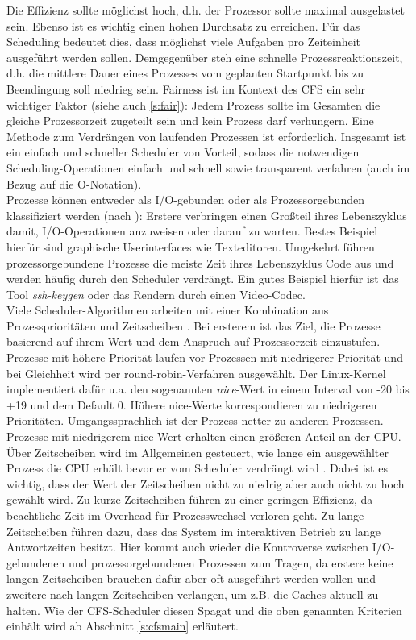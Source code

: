 Die Effizienz sollte möglichst hoch, d.h. der Prozessor sollte maximal ausgelastet sein. Ebenso ist es wichtig einen hohen Durchsatz zu erreichen. Für das Scheduling bedeutet dies, dass möglichst viele Aufgaben pro Zeiteinheit ausgeführt werden sollen. Demgegenüber steh eine schnelle Prozessreaktionszeit, d.h. die mittlere Dauer eines Prozesses vom geplanten Startpunkt bis zu Beendingung soll niedrieg sein. Fairness ist im Kontext des CFS ein sehr wichtiger Faktor (siehe auch \ref{s:fair}): Jedem Prozess sollte im Gesamten die gleiche Prozessorzeit zugeteilt sein und kein Prozess darf verhungern. Eine Methode zum Verdrängen von laufenden Prozessen ist erforderlich. Insgesamt ist ein einfach und schneller Scheduler von Vorteil, sodass die notwendigen Scheduling-Operationen einfach und schnell sowie transparent verfahren (auch im Bezug auf die O-Notation).\\
Prozesse können entweder als I/O-gebunden oder als Prozessorgebunden klassifiziert werden (nach \cite{rlove}): Erstere verbringen einen Großteil ihres Lebenszyklus damit, I/O-Ope\-rationen anzuweisen oder darauf zu warten. Bestes Beispiel hierfür sind graphische Userinterfaces wie Texteditoren. Umgekehrt führen prozessorgebundene Prozesse die meiste Zeit ihres Lebenszyklus Code aus und werden häufig durch den Scheduler verdrängt. Ein gutes Beispiel hierfür ist das Tool \textit{ssh-keygen} oder das Rendern durch einen Video-Codec.\\
Viele Scheduler-Algorithmen arbeiten mit einer Kombination aus Prozessprioritäten und Zeitscheiben \cite{rlove}. Bei ersterem ist das Ziel, die Prozesse basierend auf ihrem Wert und dem Anspruch auf Prozessorzeit einzustufen. Prozesse mit höhere Priorität laufen vor Prozessen mit niedrigerer Priorität und bei Gleichheit wird per round-robin-Verfahren ausgewählt. Der Linux-Kernel implementiert da\-für u.a. den sogenannten \textit{nice}-Wert in einem Interval von -20 bis +19 und dem Default 0. Höhere nice-Werte korrespondieren zu niedrigeren Prioritäten. Umgangssprachlich ist der Prozess  netter zu anderen Prozessen. Prozesse mit niedrigerem nice-Wert erhalten einen größeren Anteil an der CPU. Über Zeitscheiben wird im Allgemeinen gesteuert, wie lange ein ausgewählter Prozess die CPU erhält bevor er vom Scheduler verdrängt wird \cite{rlove}. Dabei ist es wichtig, dass der Wert der Zeitscheiben nicht zu niedrig aber auch nicht zu hoch gewählt wird. Zu kurze Zeitscheiben führen zu einer geringen Effizienz, da beachtliche Zeit im Overhead für Prozesswechsel verloren geht. Zu lange Zeitscheiben führen dazu, dass das System im interaktiven Betrieb zu lange Antwortzeiten besitzt. Hier kommt auch wieder die Kontroverse zwischen I/O-gebundenen und prozessorgebundenen Prozessen zum Tragen, da erstere keine langen Zeitscheiben brauchen dafür aber oft ausgeführt werden wollen und zweitere nach langen Zeitscheiben verlangen, um z.B. die Caches aktuell zu halten.
Wie der CFS-Scheduler diesen Spagat und die oben genannten Kriterien einhält wird ab Abschnitt \ref{s:cfsmain} erläu\-tert.
